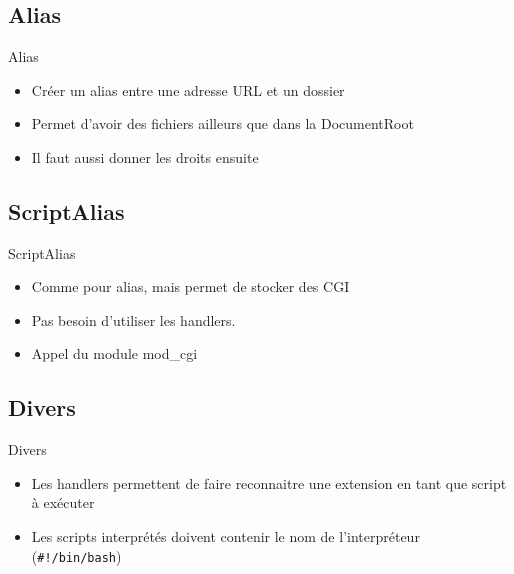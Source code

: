 \section{\sectitle}
\begin{frame}{\sectitle}
    \def\subsectitle{Alias}
    \subsection{\subsectitle}
    \begin{block}{\subsectitle}
        \begin{itemize}
            \item Créer un alias entre une adresse URL et un dossier
            \item Permet d'avoir des fichiers ailleurs que dans la DocumentRoot
            \item Il faut aussi donner les droits ensuite
        \end{itemize}
    \end{block}
    \def\subsectitle{ScriptAlias}
    \subsection{\subsectitle}
    \begin{block}{\subsectitle}
        \begin{itemize}
            \item Comme pour alias, mais permet de stocker des CGI
            \item Pas besoin d'utiliser les handlers.
            \item Appel du module mod\_cgi
        \end{itemize}
    \end{block}
\end{frame}

\begin{frame}[containsverbatim]{\sectitle}
    \def\subsectitle{Divers}
    \subsection{\subsectitle}
    \begin{block}{\subsectitle}
        \begin{itemize}
            \item Les handlers permettent de faire reconnaitre une extension en
                tant que script à exécuter
            \item Les scripts interprétés doivent contenir le nom de
                l'interpréteur (\verb+#!/bin/bash+)
        \end{itemize}
    \end{block}
\end{frame}

